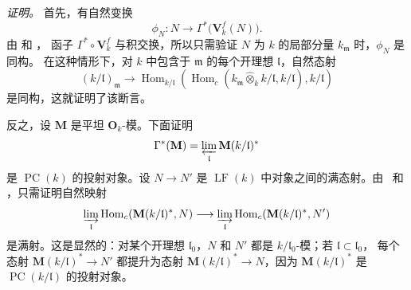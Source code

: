 \noindent\textit{证明。}
首先，有自然变换
\[
  \phi_N:
  N\longrightarrow\Gamma^*\bigl(\mathbf V_k^f(N)\bigr).
\]
由  和 ，
函子 \(\Gamma^*\circ\mathbf V_k^f\) 与积交换，所以只需验证 \(N\) 为
\(k\) 的局部分量 \(k_{\mathfrak m}\) 时，\(\phi_N\) 是同构。
在这种情形下，对 \(k\) 中包含于 \(\mathfrak m\) 的每个开理想 \(\mathfrak l\)，自然态射
\[
  (k/\mathfrak l)_{\mathfrak m}
  \longrightarrow
  \operatorname{Hom}_{k/\mathfrak l}
  \left(
    \operatorname{Hom}_c
      (k_{\mathfrak m}\widehat{\otimes}_k k/\mathfrak l,
       k/\mathfrak l),
    k/\mathfrak l
  \right)
\]
是同构，这就证明了该断言。

反之，设 \(\mathbf M\) 是平坦 \(\mathbf O_k\)-模。下面证明
\[
  \Gamma^*(\mathbf M)
  =
  \varprojlim_{\mathfrak l}\mathbf M(k/\mathfrak l)^*
\]
是 \(\operatorname{PC}(k)\) 的投射对象。设 \(N\longrightarrow N'\) 是
\(\operatorname{LF}(k)\) 中对象之间的满态射。由
\,\textup{} 和
\textup{}，只需证明自然映射
\[
  \varinjlim_{\mathfrak l}
    \operatorname{Hom}_c(\mathbf M(k/\mathfrak l)^*,N)
  \longrightarrow
  \varinjlim_{\mathfrak l}
    \operatorname{Hom}_c(\mathbf M(k/\mathfrak l)^*,N')
\]
是满射。这是显然的：对某个开理想 \(\mathfrak l_0\)，\(N\) 和 \(N'\) 都是
\(k/\mathfrak l_0\)-模；若 \(\mathfrak l\subset\mathfrak l_0\)，
每个态射 \(\mathbf M(k/\mathfrak l)^*\longrightarrow N'\) 都提升为态射
\(\mathbf M(k/\mathfrak l)^*\longrightarrow N\)，因为
\(\mathbf M(k/\mathfrak l)^*\) 是 \(\operatorname{PC}(k/\mathfrak l)\) 的投射对象。

